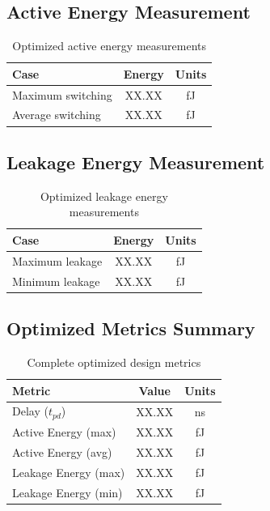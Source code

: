 \documentclass[12pt,letterpaper]{article}
\begin{document}
\subsection{Active Energy Measurement}

\begin{table}[H]
\centering
\caption{Optimized active energy measurements}
\label{tab:optimized_active_energy}
\begin{tabular}{@{}lcc@{}}
\toprule
\textbf{Case} & \textbf{Energy} & \textbf{Units} \\
\midrule
Maximum switching & XX.XX & fJ \\
Average switching & XX.XX & fJ \\
\bottomrule
\end{tabular}
\end{table}

\subsection{Leakage Energy Measurement}

\begin{table}[H]
\centering
\caption{Optimized leakage energy measurements}
\label{tab:optimized_leakage}
\begin{tabular}{@{}lcc@{}}
\toprule
\textbf{Case} & \textbf{Energy} & \textbf{Units} \\
\midrule
Maximum leakage & XX.XX & fJ \\
Minimum leakage & XX.XX & fJ \\
\bottomrule
\end{tabular}
\end{table}

\subsection{Optimized Metrics Summary}

\begin{table}[H]
\centering
\caption{Complete optimized design metrics}
\label{tab:optimized_summary}
\begin{tabular}{@{}lcc@{}}
\toprule
\textbf{Metric} & \textbf{Value} & \textbf{Units} \\
\midrule
Delay ($t_{pd}$) & XX.XX & ns \\
Active Energy (max) & XX.XX & fJ \\
Active Energy (avg) & XX.XX & fJ \\
Leakage Energy (max) & XX.XX & fJ \\
Leakage Energy (min) & XX.XX & fJ \\
\bottomrule
\end{tabular}
\end{table}
\end{document}
